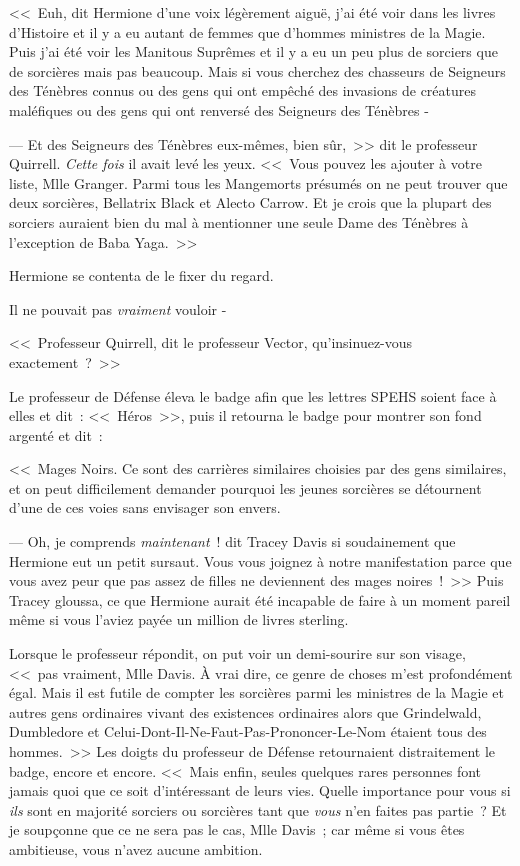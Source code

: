 <<~Euh, dit Hermione d'une voix légèrement aiguë, j'ai été voir dans les livres d'Histoire et il y a eu autant de femmes que d'hommes ministres de la Magie. Puis j'ai été voir les Manitous Suprêmes et il y a eu un peu plus de sorciers que de sorcières mais pas beaucoup. Mais si vous cherchez des chasseurs de Seigneurs des Ténèbres connus ou des gens qui ont empêché des invasions de créatures maléfiques ou des gens qui ont renversé des Seigneurs des Ténèbres -

--- Et des Seigneurs des Ténèbres eux-mêmes, bien sûr,~>> dit le professeur Quirrell. \emph{Cette fois} il avait levé les yeux. <<~Vous pouvez les ajouter à votre liste, Mlle Granger. Parmi tous les Mangemorts présumés on ne peut trouver que deux sorcières, Bellatrix Black et Alecto Carrow. Et je crois que la plupart des sorciers auraient bien du mal à mentionner une seule Dame des Ténèbres à l'exception de Baba Yaga.~>>

Hermione se contenta de le fixer du regard.

Il ne pouvait pas \emph{vraiment} vouloir -

<<~Professeur Quirrell, dit le professeur Vector, qu'insinuez-vous exactement~?~>>

Le professeur de Défense éleva le badge afin que les lettres SPEHS soient face à elles et dit~: <<~Héros~>>, puis il retourna le badge pour montrer son fond argenté et dit~:

<<~Mages Noirs. Ce sont des carrières similaires choisies par des gens similaires, et on peut difficilement demander pourquoi les jeunes sorcières se détournent d'une de ces voies sans envisager son envers.

--- Oh, je comprends \emph{maintenant}~! dit Tracey Davis si soudainement que Hermione eut un petit sursaut. Vous vous joignez à notre manifestation parce que vous avez peur que pas assez de filles ne deviennent des mages noires~!~>> Puis Tracey gloussa, ce que Hermione aurait été incapable de faire à un moment pareil même si vous l'aviez payée un million de livres sterling.

Lorsque le professeur répondit, on put voir un demi-sourire sur son visage, <<~pas vraiment, Mlle Davis. À vrai dire, ce genre de choses m'est profondément égal. Mais il est futile de compter les sorcières parmi les ministres de la Magie et autres gens ordinaires vivant des existences ordinaires alors que Grindelwald, Dumbledore et Celui-Dont-Il-Ne-Faut-Pas-Prononcer-Le-Nom étaient tous des hommes.~>> Les doigts du professeur de Défense retournaient distraitement le badge, encore et encore. <<~Mais enfin, seules quelques rares personnes font jamais quoi que ce soit d'intéressant de leurs vies. Quelle importance pour vous si \emph{ils} sont en majorité sorciers ou sorcières tant que \emph{vous} n'en faites pas partie~? Et je soupçonne que ce ne sera pas le cas, Mlle Davis~; car même si vous êtes ambitieuse, vous n'avez aucune ambition.

